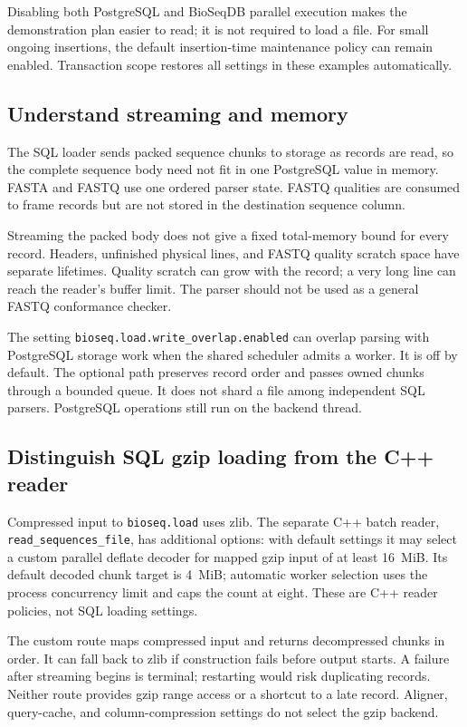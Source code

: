 Disabling both PostgreSQL and BioSeqDB parallel execution makes the
demonstration plan easier to read; it is not required to load a file.
For small ongoing insertions, the
default insertion-time maintenance policy can remain enabled. Transaction
scope restores all settings in these examples automatically.

\subsection{Understand streaming and memory}

The SQL loader sends packed sequence chunks to storage as records are read,
so the complete sequence body need not fit in one PostgreSQL value in memory.
FASTA and FASTQ use one ordered parser state. FASTQ qualities are consumed
to frame records but are not stored in the destination sequence column.

Streaming the packed body does not give a fixed total-memory bound for every
record. Headers, unfinished physical lines, and FASTQ quality scratch space
have separate lifetimes. Quality scratch can grow with the record; a very
long line can reach the reader's buffer limit. The parser should not be used
as a general FASTQ conformance checker.

The setting \texttt{bioseq.load.write\_overlap.enabled} can overlap
parsing with PostgreSQL storage work when the shared scheduler admits a
worker. It is off by default. The optional path preserves record order and
passes owned chunks through a bounded queue. It does not shard a file among
independent SQL parsers. PostgreSQL operations still run on the backend
thread.

\subsection{Distinguish SQL gzip loading from the C++ reader}

Compressed input to \texttt{bioseq.load} uses zlib. The separate C++ batch
reader, \nolinkurl{read_sequences_file}, has additional options: with default
settings it may select a custom parallel deflate decoder for mapped gzip
input of at least 16~MiB. Its default decoded chunk target is 4~MiB; automatic
worker selection uses the process concurrency limit and caps the count at
eight. These are C++ reader policies, not SQL loading settings.

The custom route maps compressed input and returns decompressed chunks in
order. It can fall back to zlib if construction fails before output starts.
A failure after streaming begins is terminal; restarting would risk
duplicating records. Neither route provides gzip range access or a shortcut
to a late record. Aligner, query-cache, and column-compression settings do not
select the gzip backend.

